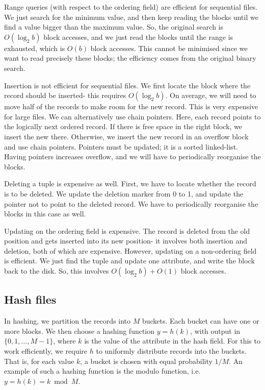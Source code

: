 \documentclass[a4paper, openany]{memoir}
\begin{document}

Range queries (with respect to the ordering field) are efficient for sequential files. We just search for the minimum value, and then keep reading the blocks until we find a value bigger than the maximum value. So, the original search is $O(\log_2 b)$ block accesses, and we just read the blocks until the range is exhausted, which is $O(b)$ block accesses. This cannot be minimised since we want to read precisely these blocks; the efficiency comes from the original binary search.

Insertion is not efficient for sequential files. We first locate the block where the record should be inserted- this requires $O(\log_2 b)$. On average, we will need to move half of the records to make room for the new record. This is very expensive for large files. We can alternatively use chain pointers. Here, each record points to the logically next ordered record. If there is free space in the right block, we insert the new there. Otherwise, we insert the new record in an overflow block and use chain pointers. Pointers must be updated; it is a sorted linked-list. Having pointers increases overflow, and we will have to periodically reorganise the blocks.

Deleting a tuple is expensive as well. First, we have to locate whether the record is to be deleted. We update the deletion marker from 0 to 1, and update the pointer not to point to the deleted record. We have to periodically reorganise the blocks in this case as well.

Updating on the ordering field is expensive. The record is deleted from the old position and gets inserted into its new position- it involves both insertion and deletion, both of which are expensive. However, updating on a non-ordering field is efficient. We just find the tuple and update one attribute, and write the block back to the disk. So, this involves $O(\log_2 b) + O(1)$ block accesses.

\subsection{Hash files}
In hashing, we partition the records into $M$ buckets. Each bucket can have one or more blocks. We then choose a hashing function $y = h(k)$, with output in $\{0, 1, \dots, M-1\}$, where $k$ is the value of the attribute in the hash field. For this to work efficiently, we require $h$ to uniformly distribute records into the buckets. That is, for each value $k$, a bucket is chosen with equal probability $1/M$. An example of such a hashing function is the modulo function, i.e. $y = h(k) = k \bmod{M}$.
\end{document}
